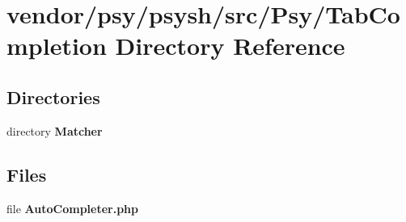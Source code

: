 \section{vendor/psy/psysh/src/\+Psy/\+Tab\+Completion Directory Reference}
\label{dir_a2920afb03c6edf2453813f5c8151860}
\subsection*{Directories}
\begin{DoxyCompactItemize}
\item 
directory {\bf Matcher}
\end{DoxyCompactItemize}
\subsection*{Files}
\begin{DoxyCompactItemize}
\item 
file {\bf Auto\+Completer.\+php}
\end{DoxyCompactItemize}
